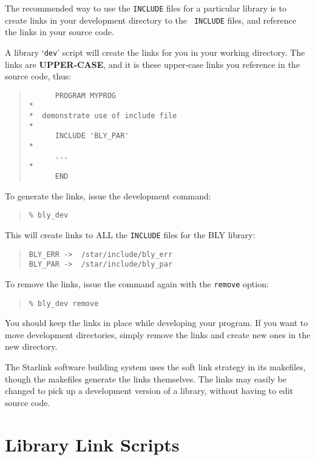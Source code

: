 \documentclass[twoside,11pt]{article}
\newcommand{\xlabel}[1]{}
\begin{document}
The recommended way to use the \texttt{INCLUDE} files for a particular
library is to create links in your development directory to the {\tt
INCLUDE} files, and reference the links in your source code. 

A library `\texttt{dev}' script will create the links for you in your
working directory.  The links are \textbf{UPPER-CASE}, and it is these 
upper-case links you reference in the source code, thus:

\begin{quote}
\begin{verbatim}
      PROGRAM MYPROG      
*
*  demonstrate use of include file
*
      INCLUDE 'BLY_PAR'
*
      ...
*
      END
\end{verbatim}
\end{quote}

To generate the links, issue the development command:

\begin{quote}
\begin{verbatim}
% bly_dev
\end{verbatim}
\end{quote}

This will create links to ALL the \texttt{INCLUDE} files for the BLY library:

\begin{quote}
\begin{verbatim}
BLY_ERR ->  /star/include/bly_err
BLY_PAR ->  /star/include/bly_par
\end{verbatim}
\end{quote}

To remove the links, issue the command again with the \texttt{remove} option:

\begin{quote}
\begin{verbatim}
% bly_dev remove
\end{verbatim}
\end{quote}

You should keep the links in place while developing your program.  If you 
want to move development directories, simply remove the links and create 
new ones in the new directory.  

The Starlink software building system uses the soft link strategy in its 
makefiles, though the makefiles generate the links themselves.  The links 
may easily be changed to pick up a development version of a library, 
without having to edit source code.

\section{\xlabel{library_link_scripts}Library Link Scripts}
\label{library_link_scripts}
\end{document}
